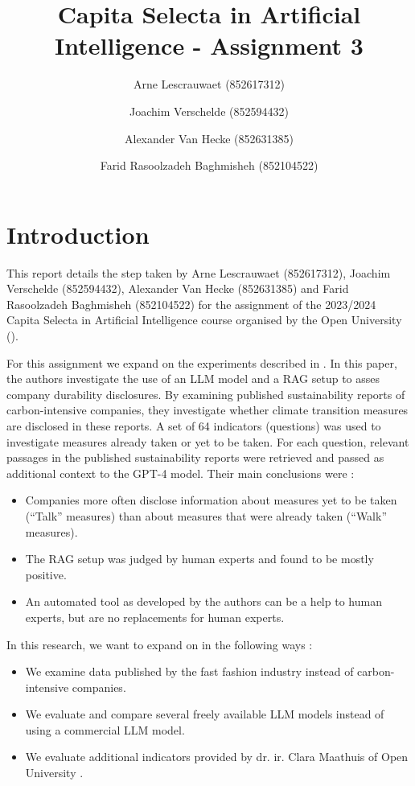 \documentclass[]{article}
\title{Capita Selecta in Artificial Intelligence - Assignment 3}
\author{Arne Lescrauwaet \small(852617312) \and Joachim Verschelde \small(852594432) \and Alexander Van Hecke \small(852631385) \and Farid Rasoolzadeh Baghmisheh \small(852104522)}
\begin{document}
\maketitle

\section{Introduction} \label{sec:introduction}
This report details the step taken by Arne Lescrauwaet (852617312), Joachim Verschelde (852594432), Alexander Van Hecke (852631385) and Farid Rasoolzadeh Baghmisheh (852104522) for the assignment of the 2023/2024 Capita Selecta in Artificial Intelligence course organised by the Open University (\cite{ou}).

For this assignment we expand on the experiments described in \cite{durability}.
In this paper, the authors investigate the use of an LLM model and a RAG setup \cite{rag} to asses company durability disclosures.
By examining published sustainability reports of carbon-intensive companies, they investigate whether climate transition measures are disclosed in these reports.
A set of 64 indicators (questions) was used to investigate measures already taken or yet to be taken.
For each question, relevant passages in the published sustainability reports were retrieved and passed as additional context to the GPT-4 model.
Their main conclusions were :

\begin{itemize}
    \item Companies more often disclose information about measures yet to be taken (``Talk'' measures) than about measures that were already taken (``Walk'' measures).
    \item The RAG setup was judged by human experts and found to be mostly positive.
    \item An automated tool as developed by the authors can be a help to human experts, but are no replacements for human experts.
\end{itemize}

In this research, we want to expand on \cite{durability} in the following ways :

\begin{itemize}
    \item We examine data published by the fast fashion industry instead of carbon-intensive companies.
    \item We evaluate and compare several freely available LLM models instead of using a commercial LLM model.
    \item We evaluate additional indicators provided by dr. ir. Clara Maathuis of Open University \cite{ou}.
\end{itemize}
\end{document}
